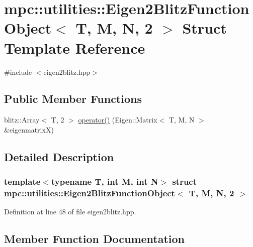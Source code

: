 \hypertarget{structmpc_1_1utilities_1_1_eigen2_blitz_function_object_3_01_t_00_01_m_00_01_n_00_012_01_4}{}\section{mpc\+:\+:utilities\+:\+:Eigen2\+Blitz\+Function\+Object$<$ T, M, N, 2 $>$ Struct Template Reference}
\label{structmpc_1_1utilities_1_1_eigen2_blitz_function_object_3_01_t_00_01_m_00_01_n_00_012_01_4}


{\ttfamily \#include $<$eigen2blitz.\+hpp$>$}

\subsection*{Public Member Functions}
\begin{DoxyCompactItemize}
\item 
blitz\+::\+Array$<$ T, 2 $>$ \mbox{\hyperlink{structmpc_1_1utilities_1_1_eigen2_blitz_function_object_3_01_t_00_01_m_00_01_n_00_012_01_4_a8dddbcd616f63253289bcf816626a7e4}{operator()}} (Eigen\+::\+Matrix$<$ T, M, N $>$ \&eigenmatrixX)
\end{DoxyCompactItemize}


\subsection{Detailed Description}
\subsubsection*{template$<$typename T, int M, int N$>$\newline
struct mpc\+::utilities\+::\+Eigen2\+Blitz\+Function\+Object$<$ T, M, N, 2 $>$}



Definition at line 48 of file eigen2blitz.\+hpp.



\subsection{Member Function Documentation}
\mbox{\label{structmpc_1_1utilities_1_1_eigen2_blitz_function_object_3_01_t_00_01_m_00_01_n_00_012_01_4_a8dddbcd616f63253289bcf816626a7e4}} 
